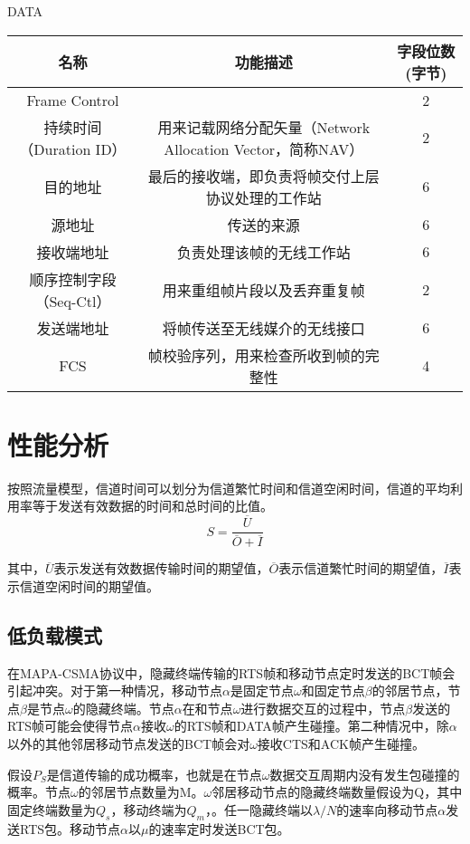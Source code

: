 DATA\\
\begin{tabular}{|c|c|c|}%
	\hline  %
	名称&功能描述&字段位数(字节)\\
	\hline  %
	Frame Control&  &2\\
	\hline %
	持续时间（Duration ID）&用来记载网络分配矢量（Network Allocation Vector，简称NAV）&2\\
	\hline
	目的地址&最后的接收端，即负责将帧交付上层协议处理的工作站&6\\
	\hline
	源地址&传送的来源&6\\
	\hline
	接收端地址&负责处理该帧的无线工作站&6\\
	\hline
	顺序控制字段（Seq-Ctl）&用来重组帧片段以及丢弃重复帧&2\\	
	\hline
	发送端地址&将帧传送至无线媒介的无线接口&6\\
	\hline
	FCS&帧校验序列，用来检查所收到帧的完整性&4\\
	\hline
\end{tabular}

\section {性能分析}
按照流量模型，信道时间可以划分为信道繁忙时间和信道空闲时间，信道的平均利用率等于发送有效数据的时间和总时间的比值。
\begin{equation}
S=\frac{\overline U}{\overline O+\overline I}
\end{equation}

其中，$\overline U$表示发送有效数据传输时间的期望值，$\overline O$表示信道繁忙时间的期望值，$\overline I$表示信道空闲时间的期望值。
	
\subsection {低负载模式}
在MAPA-CSMA协议中，隐藏终端传输的RTS帧和移动节点定时发送的BCT帧会引起冲突。对于第一种情况，移动节点$\alpha$是固定节点$\omega$和固定节点$\beta$的邻居节点，节点$\beta$是节点$\omega$的隐藏终端。节点$\alpha$在和节点$\omega$进行数据交互的过程中，节点$\beta$发送的RTS帧可能会使得节点$\alpha$接收$\omega$的RTS帧和DATA帧产生碰撞。第二种情况中，除$\alpha$以外的其他邻居移动节点发送的BCT帧会对$\omega$接收CTS和ACK帧产生碰撞。

假设$P_S$是信道传输的成功概率，也就是在节点$\omega$数据交互周期内没有发生包碰撞的概率。节点$\omega$的邻居节点数量为M。$\omega$邻居移动节点的隐藏终端数量假设为Q，其中固定终端数量为$Q_s$，移动终端为$Q_m$，。任一隐藏终端以$\lambda/N$的速率向移动节点$\alpha$发送RTS包。移动节点$\alpha$以$\mu$的速率定时发送BCT包。

